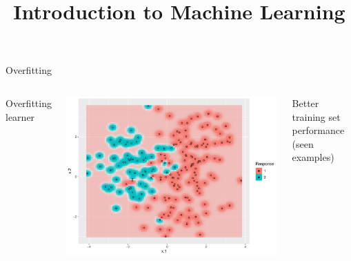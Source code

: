 

\newcommand{\titlefigure}{figure/eval_ofit_1}
\newcommand{\learninggoals}{
\item Understand what overfitting is and why it is a problem
\item Understand how to avoid overfitting}


\title{Introduction to Machine Learning}
\date{}







\begin{vbframe}{Overfitting}

\begin{columns}[T,onlytextwidth]
Overfitting learner \\
\vspace{0.5cm}
\begin{knitrout}\scriptsize
{}\color{fgcolor}

{\centering \includegraphics[width=\textwidth]{figure/eval_ofit_1} 

}



\end{knitrout}
Better training set performance (seen examples)


\end{columns}
\end{vbframe}
